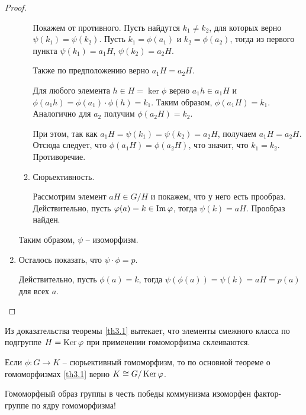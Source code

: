 \begin{proof}
\begin{enumerate}
\begin{enumerate}
            Покажем от противного. Пусть найдутся $k_1 \neq k_2$, для которых верно $\psi(k_1) = \psi(k_2)$. 
            Пусть $k_1 = \phi(a_1)$ и $k_2 = \phi(a_2)$, тогда из первого пункта $\psi(k_1) = a_1 H$, $\psi(k_2) = a_2 H$. 

            Также по предположению верно $a_1 H = a_2 H$.
            
            Для любого элемента $h \in H = \ker \phi$ верно $a_1 h \in a_1 H$ и $\phi(a_1 h) = \phi(a_1) \cdot 
            \phi(h) = k_1$. Таким образом, $\phi(a_1 H) = k_1$. 
            Аналогично для $a_2$ получим $\phi(a_2 H) = k_2$. 

            При этом, так как $a_1 H = \psi(k_1) = \psi(k_2) = a_2 H$, получаем $a_1 H = a_2 H$.
            Отсюда следует, что $\phi(a_1 H) = \phi(a_2 H)$, что значит, что $k_1 = k_2$. Противоречие.
            \item Сюрьективность.
            
            Рассмотрим элемент $aH \in G/H$ и покажем, что у него есть прообраз. Действительно, пусть
            $\varphi(a) = k \in \operatorname{Im} \varphi$, тогда $\psi(k) = aH$. Прообраз найден.
        \end{enumerate}
        Таким образом, $\psi$ -- изоморфизм.
        \item Осталось показать, что $\psi \cdot \phi = p$. 
        
        Действительно, пусть $\phi(a) = k$, тогда $\psi(\phi(a)) = \psi(k) = aH = p(a)$ для всех $a$.
    \end{enumerate}
\end{proof}

\begin{note}
    Из доказательства теоремы \ref{th3.1} вытекает, что элементы смежного класса по подгруппе 
    $H = \operatorname{Ker} \varphi$ при применении гомоморфизма склеиваются.
\end{note}

\begin{note}
    Если $\phi: G \to K$ -- сюрьективный гомоморфизм, то по основной теореме о гомоморфизмах 
    \ref{th3.1} верно $K \cong G/\operatorname{Ker} \varphi$.
\end{note}

\begin{note}
    Гомоморфный образ группы в честь победы коммунизма изоморфен фактор-группе по ядру гомоморфизма!
\end{note}

